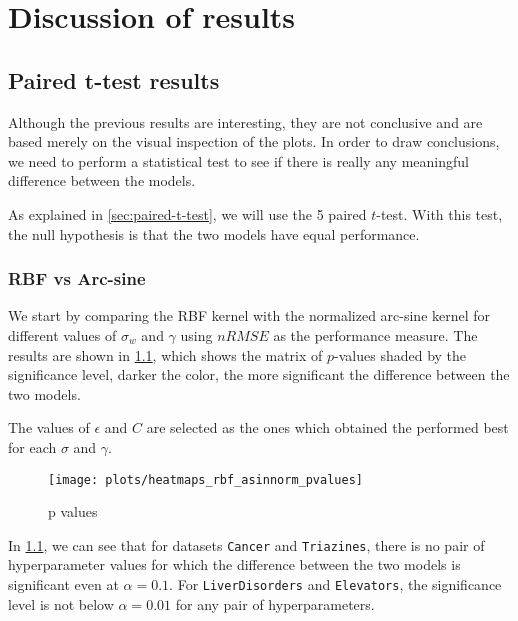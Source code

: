 \chapter{Discussion of results}
\label{sec:analysis}

\section{Paired t-test results}

Although the previous results are interesting, they are not conclusive and
are based merely on the visual inspection of the plots. In order to draw
conclusions, we need to perform a statistical test to see if there is
really any meaningful difference between the models.

As explained in \cref{sec:paired-t-test}, we will use the 5
paired $t$-test. With this test, the null hypothesis is that the two models
have equal performance.

\subsection{RBF vs Arc-sine}

We start by comparing the RBF kernel with the normalized arc-sine kernel for
different values of $\sigma_w$ and $\gamma$ using $nRMSE$ as the performance
measure. The results are shown in \cref{fig:paired-ttest-rbf-asinnorm},
which shows the matrix of $p$-values shaded by the significance level,
darker the color, the more significant the difference between the two models.

The values of $\epsilon$ and $C$ are selected as the ones which obtained
the performed best for each $\sigma$ and $\gamma$.

\begin{figure}[H]
    \texttt{[image: plots/heatmaps\_rbf\_asinnorm\_pvalues]}
    \caption{p values}
    \label{fig:paired-ttest-rbf-asinnorm}
\end{figure}

In \cref{fig:paired-ttest-rbf-asinnorm}, we can see that for datasets
\texttt{Cancer} and \texttt{Triazines}, there is no pair of hyperparameter
values for which the difference between the two models is significant even at
$\alpha=0.1$. For \texttt{LiverDisorders} and \texttt{Elevators}, the significance
level is not below $\alpha=0.01$ for any pair of hyperparameters.

